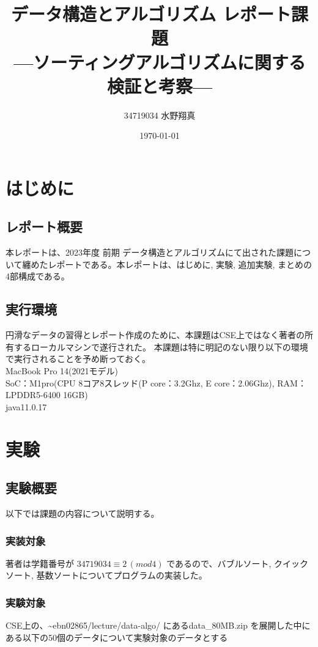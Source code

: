 \documentclass[a4j,dvipdfmx]{jsreport}
\title{
データ構造とアルゴリズム レポート課題
\large{\\---ソーティングアルゴリズムに関する検証と考察---}
}
\author{34719034 水野翔真}
\date{\today}
\begin{document}
\maketitle
\tableofcontents

\chapter{はじめに}
\section{レポート概要}
本レポートは、2023年度 前期 データ構造とアルゴリズムにて出された課題について纏めたレポートである。本レポートは、はじめに, 実験, 追加実験, まとめの4部構成である。
\section{実行環境}
円滑なデータの習得とレポート作成のために、本課題はCSE上ではなく著者の所有するローカルマシンで遂行された。
本課題は特に明記のない限り以下の環境で実行されることを予め断っておく。\\
MacBook Pro 14(2021モデル)\\
SoC：M1pro(CPU 8コア8スレッド(P core：3.2Ghz, E core：2.06Ghz), RAM：LPDDR5-6400 16GB)\\java11.0.17

\chapter{実験}
\section{実験概要}
以下では課題の内容について説明する。
\subsection{実装対象}
著者は学籍番号が $34719034 \equiv 2 \, (mod4)$ であるので、バブルソート, クイックソート, 基数ソートについてプログラムの実装した。
\subsection{実験対象}
CSE上の、\textasciitilde ebn02865/lecture/data-algo/ にあるdata\_80MB.zip を展開した中にある以下の50個のデータについて実験対象のデータとする\\
\end{document}
